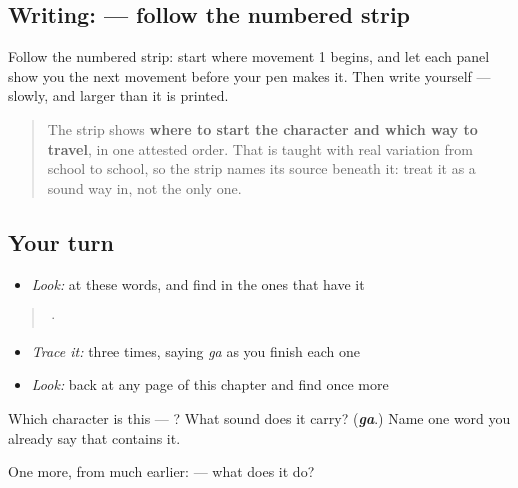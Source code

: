 \subsection*{Writing:  — follow the numbered strip}

Follow the numbered strip: start where movement 1 begins, and let each panel show you the next movement before your pen makes it. Then write  yourself — slowly, and larger than it is printed.

\begin{quote}
The strip shows \textbf{where to start the character and which way to travel}, in one attested order. That is taught with real variation from school to school, so the strip names its source beneath it: treat it as a sound way in, not the only one.
\end{quote}

\subsection*{Your turn}
\begin{itemize}
\raggedright
  \item \emph{Look:} at these words, and find  in the ones that have it
\end{itemize}

\begin{quote}
  ·  
\end{quote}

\begin{itemize}
\raggedright
  \item \emph{Trace it:}  three times, saying \emph{ga} as you finish each one
  \item \emph{Look:} back at any page of this chapter and find  once more
\end{itemize}

\begin{tcolorbox}[breakable,colback=teal!4,colframe=teal!35!black,title={Before you move on}]
Which character is this — ? What sound does it carry? (\emph{\textbf{ga}}.) Name one word you already say that contains it.

One more, from much earlier:  — what does it do?
\end{tcolorbox}
